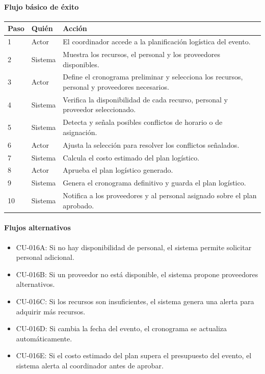 \paragraph{Flujo básico de éxito}
\begin{longtable}{P{1.1cm}P{1.8cm}P{10.5cm}}
\toprule
\textbf{Paso} & \textbf{Quién} & \textbf{Acción}\\
\midrule
{} & Actor & El coordinador accede a la planificación logística del evento.\\
2 & Sistema & Muestra los recursos, el personal y los proveedores disponibles.\\
3 & Actor & Define el cronograma preliminar y selecciona los recursos, personal y proveedores necesarios.\\
4 & Sistema & Verifica la disponibilidad de cada recurso, personal y proveedor seleccionado.\\
5 & Sistema & Detecta y señala posibles conflictos de horario o de asignación.\\
6 & Actor & Ajusta la selección para resolver los conflictos señalados.\\
7 & Sistema & Calcula el costo estimado del plan logístico.\\
8 & Actor & Aprueba el plan logístico generado.\\
9 & Sistema & Genera el cronograma definitivo y guarda el plan logístico.\\
10 & Sistema & Notifica a los proveedores y al personal asignado sobre el plan aprobado.\\
\bottomrule
\end{longtable}

\paragraph{Flujos alternativos}
\begin{itemize}[leftmargin=1.4em, topsep=1pt]
  \item CU-016A: Si no hay disponibilidad de personal, el sistema permite solicitar personal adicional.
  \item CU-016B: Si un proveedor no está disponible, el sistema propone proveedores alternativos.
  \item CU-016C: Si los recursos son insuficientes, el sistema genera una alerta para adquirir más recursos.
  \item CU-016D: Si cambia la fecha del evento, el cronograma se actualiza automáticamente.
  \item CU-016E: Si el costo estimado del plan supera el presupuesto del evento, el sistema alerta al coordinador antes de aprobar.
\end{itemize}

